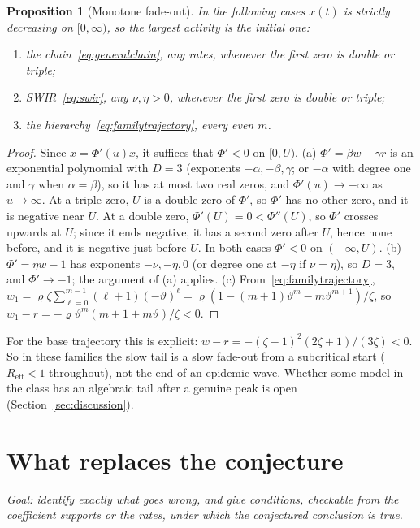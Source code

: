 \documentclass[11pt,a4paper]{article}
\newtheorem{proposition}[theorem]{Proposition}
\theoremstyle{definition}\newtheorem{definition}[theorem]{Definition}
\theoremstyle{remark}\newtheorem{remark}[theorem]{Remark}
\begin{document}
\begin{proposition}[Monotone fade-out]
\label{prop:nopeak}
In the following cases $x(t)$ is strictly decreasing on $[0,\infty)$, so
the largest activity is the initial one:
\begin{enumerate}[label=(\alph*)]
\item the chain~\eqref{eq:generalchain}, any rates, whenever the first
zero is double or triple;
\item SWIR~\eqref{eq:swir}, any $\nu,\eta>0$, whenever the first zero is
double or triple;
\item the hierarchy~\eqref{eq:familytrajectory}, every even $m$.
\end{enumerate}
\end{proposition}
\begin{proof}
Since $\dot x=\Phi'(u)x$, it suffices that $\Phi'<0$ on $[0,U)$.
(a) $\Phi'=\beta w-\gamma r$ is an exponential polynomial with $D=3$
(exponents $-\alpha,-\beta,\gamma$; or $-\alpha$ with degree one and
$\gamma$ when $\alpha=\beta$), so it has at most two real zeros, and
$\Phi'(u)\to-\infty$ as $u\to\infty$. At a triple zero, $U$ is a double
zero of $\Phi'$, so $\Phi'$ has no other zero, and it is negative near
$U$. At a double zero, $\Phi'(U)=0<\Phi''(U)$, so $\Phi'$ crosses
upwards at $U$; since it ends negative, it has a second zero after $U$,
hence none before, and it is negative just before $U$. In both cases
$\Phi'<0$ on $(-\infty,U)$.
(b) $\Phi'=\eta w-1$ has exponents $-\nu,-\eta,0$ (or degree one at
$-\eta$ if $\nu=\eta$), so $D=3$, and $\Phi'\to-1$; the argument of (a)
applies.
(c) From~\eqref{eq:familytrajectory},
$w_1=\varrho\zeta\sum_{\ell=0}^{m-1}(\ell+1)(-\vartheta)^\ell
=\varrho(1-(m+1)\vartheta^m-m\vartheta^{m+1})/\zeta$, so
$w_1-r=-\varrho\vartheta^m(m+1+m\vartheta)/\zeta<0$.
\end{proof}
For the base trajectory this is explicit:
$w-r=-(\zeta-1)^2(2\zeta+1)/(3\zeta)<0$. So in these families the slow
tail is a slow fade-out from a subcritical start
($R_{\mathrm{eff}}<1$ throughout), not the end of an epidemic wave.
Whether some model in the class has an algebraic tail after a genuine
peak is open (Section~\ref{sec:discussion}).

\section{What replaces the conjecture}
\label{sec:spectral}

\emph{Goal: identify exactly what goes wrong, and give conditions,
checkable from the coefficient supports or the rates, under which the conjectured
conclusion is true.}
\end{document}
